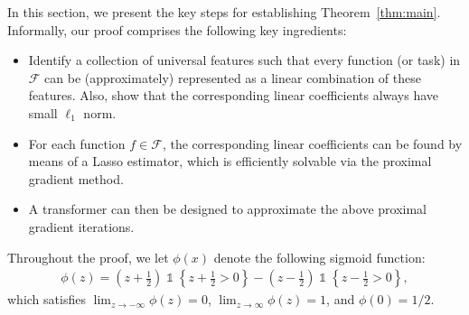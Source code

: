\documentclass[english]{article}
\DeclareMathOperator{\ind}{\mathds{1}}  %
\begin{document}
In this section, we present the key steps for establishing Theorem~\ref{thm:main}. 
%
Informally, our proof comprises the following key ingredients: 
%
\begin{itemize}
    \item Identify a collection of universal features such that every function (or task) in $\mathcal{F}$ can be (approximately) represented as a linear combination of these features. Also, show that the corresponding linear coefficients always have small $\ell_1$ norm. 

    \item For each function $f\in \mathcal{F}$, the corresponding linear coefficients can be found by means of a Lasso estimator, which is efficiently solvable via the proximal gradient method. 

    \item A transformer can then be designed to approximate the above proximal gradient iterations. 
\end{itemize}
%
Throughout the proof, 
we let $\phi(x)$ denote the following sigmoid function:
%
\begin{align}\label{eq:def-func-phi}
	\phi(z) = \left(z+\frac12\right)\ind\left\{z+\frac12 > 0\right\} - \left(z-\frac12\right)\ind\left\{z-\frac12 > 0\right\},
\end{align}
%
which satisfies
%
$\lim_{z\to-\infty} \phi(z) = 0$, $\lim_{z\to\infty} \phi(z) = 1$, and $\phi(0) = 1/2$.
%
\end{document}
